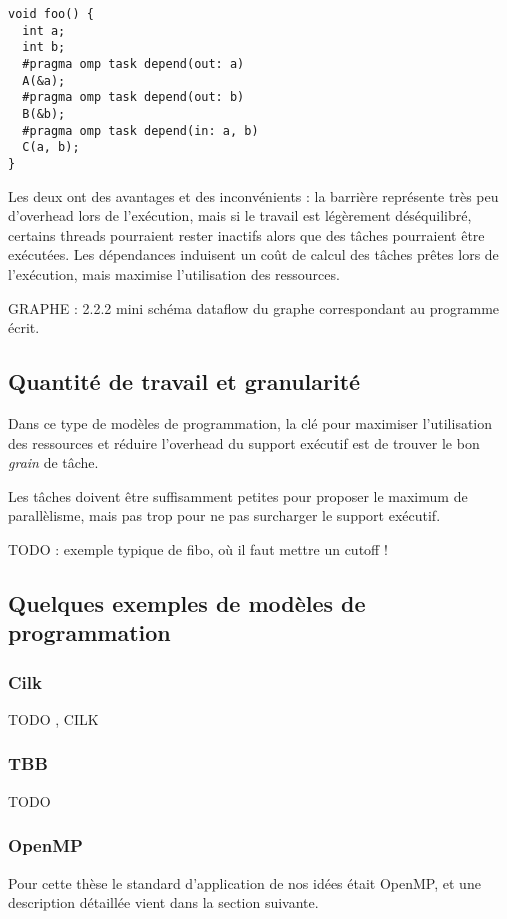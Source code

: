 \begin{lstlisting}[caption=Synchronisation via des dépendances,label=lst:context:task-dep]
void foo() {
  int a;
  int b;
  #pragma omp task depend(out: a)
  A(&a);
  #pragma omp task depend(out: b)
  B(&b);
  #pragma omp task depend(in: a, b)
  C(a, b);
}
\end{lstlisting}

Les deux ont des avantages et des inconvénients : la barrière représente très peu d'overhead lors de l'exécution, mais si le travail est légèrement déséquilibré, certains threads pourraient rester inactifs alors que des tâches pourraient être exécutées.
Les dépendances induisent un coût de calcul des tâches prêtes lors de l'exécution, mais maximise l'utilisation des ressources.

GRAPHE : 2.2.2 mini schéma dataflow du graphe correspondant au programme écrit.

\subsection{Quantité de travail et granularité}

Dans ce type de modèles de programmation, la clé pour maximiser l'utilisation des ressources et réduire l'overhead du support exécutif est de trouver le bon \emph{grain} de tâche.

Les tâches doivent être suffisamment petites pour proposer le maximum de parallèlisme, mais pas trop pour ne pas surcharger le support exécutif.

TODO : exemple typique de fibo, où il faut mettre un cutoff !


\subsection{Quelques exemples de modèles de programmation}


\subsubsection{Cilk}

TODO
\cite{cilk5}, CILK

\subsubsection{TBB}

TODO

\subsubsection{OpenMP}

Pour cette thèse le standard d'application de nos idées était OpenMP, et une description détaillée vient dans la section suivante.

